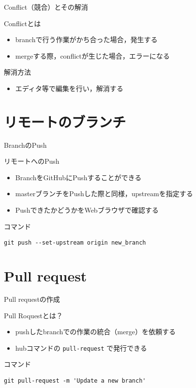 \documentclass[t, aspectratio=169]{beamer}
\begin{document}
\begin{frame}[label=sec-3-1-4]{Conflict（競合）とその解消}
\begin{block}{Conflictとは}
\begin{itemize}
\item branchで行う作業がかち合った場合，発生する
\item mergeする際，conflictが生じた場合，エラーになる
\end{itemize}
\end{block}
\begin{block}{解消方法}
\begin{itemize}
\item エディタ等で編集を行い，解消する
\end{itemize}
\end{block}
\end{frame}

\section{リモートのブランチ}
\label{sec-3-2}
\begin{frame}[fragile,label=sec-3-2-1]{BranchのPush}
 \begin{block}{リモートへのPush}
\begin{itemize}
\item BranchをGitHubにPushすることができる
\item masterブランチをPushした際と同様，upstreamを指定する
\item PushできたかどうかをWebブラウザで確認する
\end{itemize}
\end{block}

\begin{block}{コマンド}
\begin{verbatim}
git push --set-upstream origin new_branch
\end{verbatim}
\end{block}
\end{frame}

\section{Pull request}
\label{sec-3-3}
\begin{frame}[fragile,label=sec-3-3-1]{Pull requestの作成}
 \begin{block}{Pull Roquestとは？}
\begin{itemize}
\item pushしたbranchでの作業の統合（merge）を依頼する
\item hubコマンドの \texttt{pull-request} で発行できる
\end{itemize}
\end{block}

\begin{block}{コマンド}
\begin{verbatim}
git pull-request -m 'Update a new branch'
\end{verbatim}
\end{block}
\end{frame}
\end{document}
